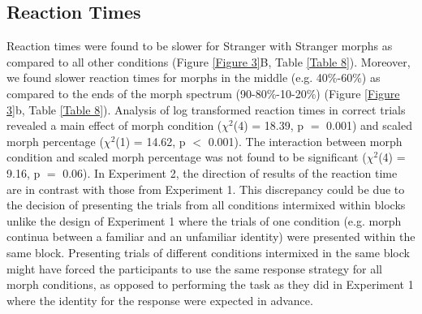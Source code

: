\documentclass[10pt,letterpaper]{article}
\begin{document}
\subsection*{Reaction Times}
Reaction times were found to be slower for Stranger with Stranger morphs as compared to all other conditions (Figure \ref{Figure 3}B, Table \ref{Table 8}). Moreover, we found slower reaction times for morphs in the middle (e.g. 40\%-60\%) as compared to the ends of the morph spectrum (90-80\%-10-20\%) (Figure \ref{Figure 3}b, Table \ref{Table 8}). Analysis of log transformed reaction times in correct trials revealed a main effect of morph condition (\( \chi^2 \)(4) = 18.39, p $=$ 0.001) and scaled morph percentage (\( \chi^2 \)(1) = 14.62, p $<$ 0.001). The interaction between morph condition and scaled morph percentage was not found to be significant (\( \chi^2 \)(4) = 9.16, p $=$ 0.06). In Experiment 2, the direction of results of the reaction time are in contrast with those from Experiment 1. This discrepancy could be due to the decision of presenting the trials from all conditions intermixed within blocks unlike the design of Experiment 1 where the trials of one condition (e.g. morph continua between a familiar and an unfamiliar identity) were presented within the same block. Presenting trials of different conditions intermixed in the same block might have forced the participants to use the same response strategy for all morph conditions, as opposed to performing the task as they did in Experiment 1 where the identity for the response were expected in advance.  
\end{document}
